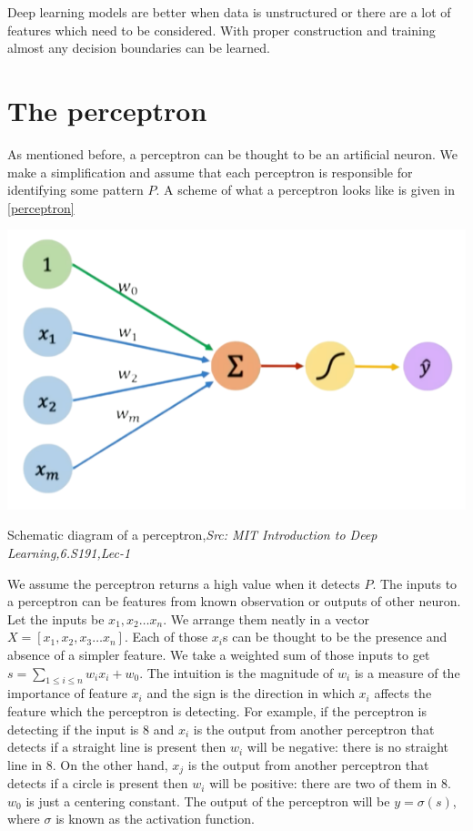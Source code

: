 Deep learning models are better when data is unstructured or there are a lot of features which
need to be considered. With proper construction and training almost any decision boundaries
can be learned.
\section{The perceptron}
As mentioned before, a perceptron can be thought to be an artificial neuron. We make a simplification and assume that each perceptron is responsible for identifying some pattern $P$. A scheme of what a perceptron looks like is given in \ref{perceptron}
\begin{marginfigure}
    \begin{center}
        \includegraphics[width=\textwidth]{graphics/nobg perceptron.png}
    \end{center}
    \caption{Schematic diagram of a perceptron,\textit{Src: MIT Introduction to Deep Learning,6.S191,Lec-1}}\label{perceptron}
\end{marginfigure} 
We assume the perceptron returns a high value when it detects $P$. The inputs to a perceptron can be features from known observation or outputs of other neuron. Let the inputs be $x_1,x_2\hdots x_n$. We arrange them neatly in a vector $X=[x_1,x_2,x_3\hdots x_n]$. Each of those $x_i$s can be thought to be the presence and absence of a simpler feature. We take a weighted sum of those inputs to get $s=\sum_{1\leq i\leq n}w_ix_i+w_0$. The intuition is the magnitude of $w_i$ is a measure of the importance of feature $x_i$ and the sign is the direction in which $x_i$ affects the feature which the perceptron is detecting. For example, if the perceptron is detecting if the input is 8 and $x_i$ is the output from another perceptron that detects if a straight line is present then $w_i$ will be negative: there is no straight line in 8. On the other hand,  $x_j$ is the output from another perceptron that detects if a circle is present then $w_i$ will be positive: there are two of them in 8. $w_0$ is just a centering constant. The output of the perceptron will be $y=\sigma(s)$, where $\sigma$ is known as the activation function. 